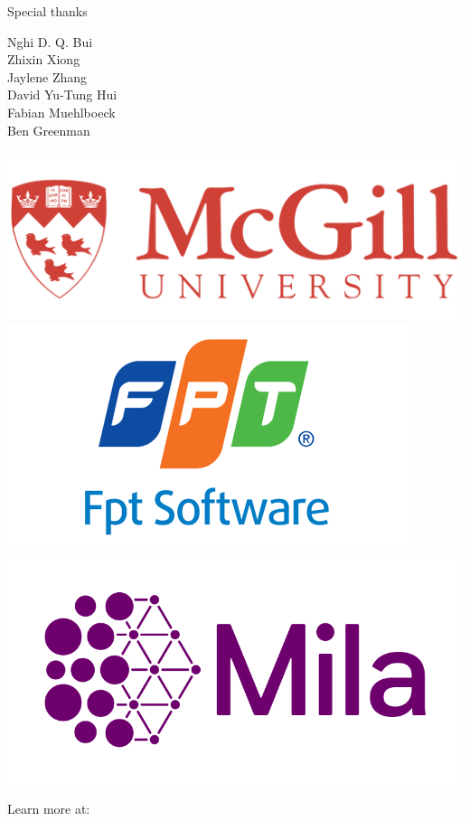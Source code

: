 \documentclass{beamer}
\begin{document}
    \begin{frame}{Special thanks}
            \begin{center}
                \LARGE{
                    Nghi D. Q. Bui\\
                    Zhixin Xiong\\
                    Jaylene Zhang\\
                    David Yu-Tung Hui\\
                    Fabian Muehlboeck\\
                    Ben Greenman\\
                    \phantom{}\\
                }
                \href{https://cs.mcgill.ca}{\includegraphics[scale=0.08]{../figures/mcgill_logo.png}}
                \href{https://www.fpt-software.com}{\includegraphics[scale=0.19]{../figures/fpt_logo.png}}
                \href{https://mila.quebec}{\includegraphics[scale=0.13]{../figures/mila_logo.png}}
            \end{center}
    \end{frame}

    \begin{frame}
        \begin{center}
            \Huge{Learn more at: \\~\\
            \href{http://array22.ndan.co}{\color{blue}{http://array22.ndan.co}}}
        \end{center}
    \end{frame}
\end{document}
